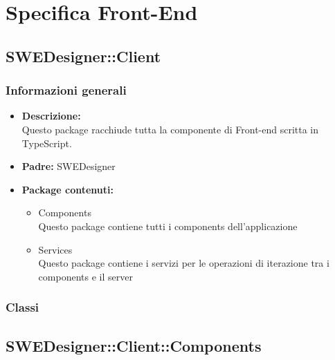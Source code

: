 \section{Specifica Front-End}
	\subsection{SWEDesigner::Client}
		\subsubsection{Informazioni generali}
			\begin{itemize}
          		\item \textbf{Descrizione:}\\
          		Questo package racchiude tutta la componente di Front-end scritta in TypeScript.
          		\item \textbf{Padre:} SWEDesigner
          		\item \textbf{Package contenuti:}\\
          		\begin{itemize}
          			\item Components\\
          			Questo package contiene tutti i components dell’applicazione
          			\item Services\\
          			Questo package contiene i servizi per le operazioni di iterazione tra i components e
il server
          		\end{itemize}
          	\end{itemize}
		\subsubsection{Classi}
	\subsection{SWEDesigner::Client::Components}
